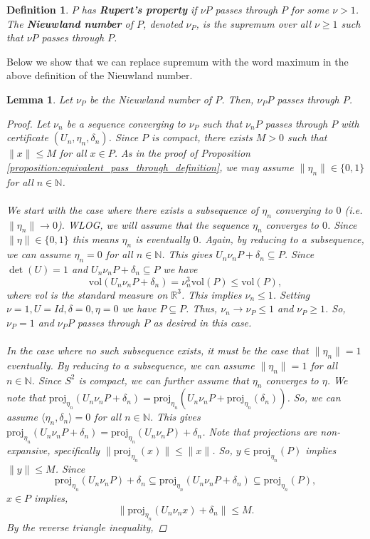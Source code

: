 \documentclass[a4paper]{amsart}
\newtheorem{lem}[thm]{Lemma}
\newtheorem{dfn}[thm]{Definition}
\theoremstyle{remark}
\begin{document}
\begin{dfn}\label{dfn:Nieuwland 1}
	$P$ has \textbf{Rupert's property} if $\nu P$ passes through $P$ for some $\nu>1$. The \textbf{Nieuwland number} of $P$, denoted $\nu_P$, is the supremum over all $\nu\geq1$ such that $\nu P$ passes through $P$.
\end{dfn}
\noindent
Below we show that we can replace supremum with the word maximum in the above definition of the Nieuwland number.
\begin{lem}\label{lem:max_number}
Let $\nu_P$ be the Nieuwland number of $P$. Then, $\nu_P P$ passes through $P$.
\begin{proof}
Let $\nu_n$ be a sequence converging to $\nu_P$ such that $\nu_n P$ passes through $P$ with certificate $(U_n,\eta_n,\delta_n)$. Since $P$ is compact, there exists $M>0$ such that $\|x\|\leq M$ for all $x\in P$. As in the proof of Proposition \ref{proposition:equivalent_pass_through_definition}, we may assume $\|\eta_n\|\in\{0,1\}$ for all $n\in\mathbb{N}$. 
\\\\
We start with the case where there exists a subsequence of $\eta_n$ converging to $0$ (i.e. $\|\eta_n\|\to0$). WLOG, we will assume that the sequence $\eta_n$ converges to $0$. Since $\|\eta\|\in\{0,1\}$ this means $\eta_n$ is eventually $0$. Again, by reducing to a subsequence, we can assume $\eta_n=0$ for all $n\in\mathbb{N}$. This gives $U_n\nu_nP+\delta_n\subseteq P$. Since $\det(U)=1$ and $U_n\nu_nP+\delta_n\subseteq P$ we have $$\text{vol}(U_n\nu_nP+\delta_n)=\nu_n^3\text{vol}(P)\leq \text{vol}(P),$$ where vol is the standard measure on $\mathbb{R}^3$. This implies $\nu_n \leq 1$. Setting $\nu=1, U=Id, \delta=0, \eta=0$ we have $P\subseteq P$. Thus, $\nu_n\to \nu_P\leq 1$ and $\nu_P \geq 1$. So, $\nu_P=1$ and $\nu_P P$ passes through $P$ as desired in this case.
\\\\
In the case where no such subsequence exists, it must be the case that $\|\eta_n\|=1$ eventually. By reducing to a subsequence, we can assume $\|\eta_n\|=1$ for all $n\in \mathbb{N}$. Since $S^2$ is compact, we can further assume that $\eta_n$ converges to $\eta$. We note that $\textrm{proj}_{\eta_n}(U_n\nu_nP+\delta_n)=\textrm{proj}_{\eta_n}(U_n\nu_nP+\textrm{proj}_{\eta_n}(\delta_n))$. So, we can assume $\langle \eta_n,\delta_n\rangle=0$ for all $n\in\mathbb{N}$. This gives $\textrm{proj}_{\eta_n}(U_n\nu_nP+\delta_n)=\textrm{proj}_{\eta_n}(U_n\nu_nP)+\delta_n$. Note that projections are non-expansive, specifically $\|\textrm{proj}_{\eta_n}(x)\|\leq \|x\|$. So, $y\in \textrm{proj}_{\eta_n}(P)$ implies $\|y\|\leq M$. Since $$\textrm{proj}_{\eta_n}(U_n\nu_nP)+\delta_n\subseteq \textrm{proj}_{\eta_n}(U_n\nu_nP+\delta_n)\subseteq \textrm{proj}_{\eta_n}(P),$$ $x\in P$ implies, $$\|\textrm{proj}_{\eta_n}(U_n\nu_nx)+\delta_n\|\leq M.$$ By the reverse triangle inequality,

\end{proof}
\end{lem}
\end{document}
